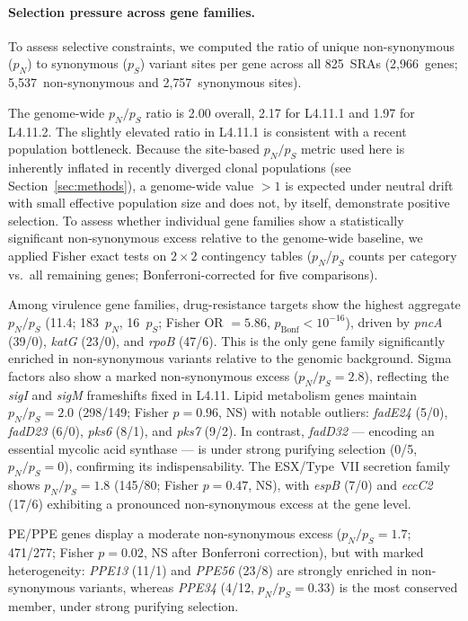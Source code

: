 \documentclass[11pt,a4paper]{article}
\newcommand{\lignee}[1]{\textsf{#1}}
\begin{document}
\paragraph{Selection pressure across gene families.}

To assess selective constraints, we computed the ratio of unique
non-synonymous ($p_N$) to synonymous ($p_S$) variant sites per gene
across all 825~SRAs (2{,}966~genes;
5{,}537~non-synonymous and 2{,}757~synonymous sites).

The genome-wide $p_N/p_S$ ratio is 2.00 overall, 2.17 for
\lignee{L4.11.1} and 1.97 for \lignee{L4.11.2}.  The slightly elevated
ratio in \lignee{L4.11.1} is consistent with a recent population
bottleneck.  Because the site-based $p_N/p_S$ metric used here is
inherently inflated in recently diverged clonal populations (see
Section~\ref{sec:methods}), a genome-wide value $>1$ is expected under
neutral drift with small effective population size and does not, by
itself, demonstrate positive selection.  To assess whether individual
gene families show a statistically significant non-synonymous excess
relative to the genome-wide baseline, we applied Fisher exact tests
on $2 \times 2$ contingency tables ($p_N$/$p_S$ counts per category
vs.\ all remaining genes; Bonferroni-corrected for five comparisons).

Among virulence gene families, drug-resistance targets show the highest
aggregate $p_N/p_S$ (11.4; 183~$p_N$, 16~$p_S$; Fisher OR $= 5.86$,
$p_{\mathrm{Bonf}} < 10^{-16}$), driven by
\textit{pncA} (39/0), \textit{katG} (23/0), and \textit{rpoB}
(47/6).  This is the only gene family significantly enriched in
non-synonymous variants relative to the genomic background.
Sigma factors also show a marked non-synonymous excess
($p_N/p_S = 2.8$), reflecting the \textit{sigI} and \textit{sigM}
frameshifts fixed in \lignee{L4.11}.
Lipid metabolism genes maintain $p_N/p_S = 2.0$ (298/149; Fisher
$p = 0.96$, NS) with notable
outliers: \textit{fadE24} (5/0), \textit{fadD23} (6/0), \textit{pks6}
(8/1), and \textit{pks7} (9/2).  In contrast, \textit{fadD32} --- encoding
an essential mycolic acid synthase --- is under strong purifying
selection (0/5, $p_N/p_S = 0$), confirming its indispensability.
The ESX/Type~VII secretion family shows $p_N/p_S = 1.8$ (145/80;
Fisher $p = 0.47$, NS), with
\textit{espB} (7/0) and \textit{eccC2} (17/6) exhibiting a pronounced
non-synonymous excess at the gene level.

PE/PPE genes display a moderate non-synonymous excess ($p_N/p_S = 1.7$;
471/277; Fisher $p = 0.02$, NS after Bonferroni correction),
but with marked heterogeneity: \textit{PPE13} (11/1) and
\textit{PPE56} (23/8) are strongly enriched in non-synonymous variants, whereas
\textit{PPE34} (4/12, $p_N/p_S = 0.33$) is the most conserved member,
under strong purifying selection.
\end{document}
